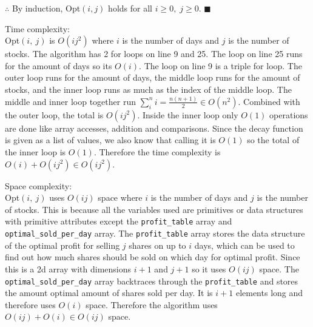 \documentclass[12pt]{article}
\begin{document}
\vspace{1em}
$\therefore$ By induction, Opt$(i, j)$ holds for all $i \geq 0,\;j \geq 0$. \hfill $\blacksquare$\vspace{1em}

\newpage
Time complexity:\\
Opt$(i,\ j)$ is $O(ij^2)$ where $i$ is the number of days and $j$ is the number of stocks.
The algorithm has 2 for loops on line 9 and 25. The loop on line 25 runs for the
amount of days so its $O(i)$. The loop on line 9 is a triple for loop.
The outer loop runs for the amount of days, the middle loop runs for the amount of stocks,
and the inner loop runs as much as the index of the middle loop.
The middle and inner loop together run $\sum_i^n i = \frac{n(n+1)}{2} \in O(n^2)$.
Combined with the outer loop, the total is $O(ij^2)$. Inside the inner loop only $O(1)$ operations are done like array accesses,
addition and comparisons. Since the decay function is given as a list of values,
we also know that calling it is $O(1)$ so the total of the inner loop is $O(1)$.
Therefore the time complexity is $O(i) + O(ij^2) \in O(ij^2)$.\vspace{1em}

Space complexity:\\
Opt$(i,\ j)$ uses $O(ij)$ space where $i$ is the number of days and $j$ is the number of stocks.
This is because all the variables used are primitives or data structures with primitive
attributes except the \texttt{profit\_table} array and \texttt{optimal\_sold\_per\_day} array.
The \texttt{profit\_table} array stores the data structure of the optimal profit for selling $j$ shares on up to $i$ days,
which can be used to find out how much shares should be sold on which day for optimal profit.
Since this is a 2d array with dimensions $i+1$ and $j+1$ so it uses $O(ij)$ space.
The \texttt{optimal\_sold\_per\_day} array backtraces through the \texttt{profit\_table} and stores the amount optimal amount of shares sold per day.
It is $i+1$ elements long and therefore uses $O(i)$ space.
Therefore the algorithm uses $O(ij) + O(i) \in O(ij)$ space.
\end{document}

